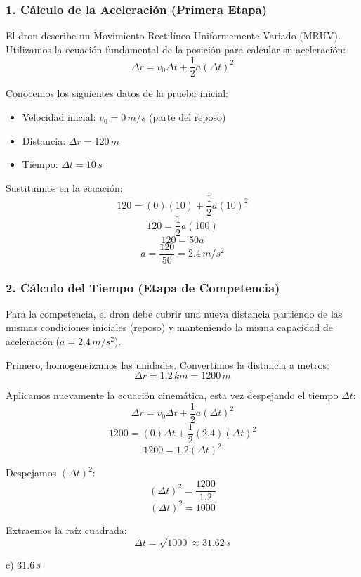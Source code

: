 \documentclass[12pt, a4paper]{article}
\begin{document}
\subsubsection*{1. Cálculo de la Aceleración (Primera Etapa)}
El dron describe un Movimiento Rectilíneo Uniformemente Variado (MRUV). Utilizamos la ecuación fundamental de la posición para calcular su aceleración:
$$ \Delta r = v_0 \Delta t + \frac{1}{2} a (\Delta t)^2 $$

Conocemos los siguientes datos de la prueba inicial:
\begin{itemize}
    \item Velocidad inicial: $v_0 = 0 \, \si{m/s}$ (parte del reposo)
    \item Distancia: $\Delta r = 120 \, \si{m}$
    \item Tiempo: $\Delta t = 10 \, \si{s}$
\end{itemize}

Sustituimos en la ecuación:
$$ 120 = (0)(10) + \frac{1}{2} a (10)^2 $$
$$ 120 = \frac{1}{2} a (100) $$
$$ 120 = 50 a $$
$$ a = \frac{120}{50} = 2.4 \, \si{m/s^2} $$

\subsubsection*{2. Cálculo del Tiempo (Etapa de Competencia)}
Para la competencia, el dron debe cubrir una nueva distancia partiendo de las mismas condiciones iniciales (reposo) y manteniendo la misma capacidad de aceleración ($a = 2.4 \, \si{m/s^2}$).

Primero, homogeneizamos las unidades. Convertimos la distancia a metros:
$$ \Delta r = 1.2 \, \si{km} = 1200 \, \si{m} $$

Aplicamos nuevamente la ecuación cinemática, esta vez despejando el tiempo $\Delta t$:
$$ \Delta r = v_0 \Delta t + \frac{1}{2} a (\Delta t)^2 $$
$$ 1200 = (0)\Delta t + \frac{1}{2} (2.4) (\Delta t)^2 $$
$$ 1200 = 1.2 (\Delta t)^2 $$

Despejamos $(\Delta t)^2$:
$$ (\Delta t)^2 = \frac{1200}{1.2} $$
$$ (\Delta t)^2 = 1000 $$

Extraemos la raíz cuadrada:
$$ \Delta t = \sqrt{1000} \approx 31.62 \, \si{s} $$

\begin{tcolorbox}[colback=green!5!white, colframe=green!50!black, title=Respuesta Final]
\centering \Large c) $31.6 \, \si{s}$
\end{tcolorbox}

\newpage
\end{document}
